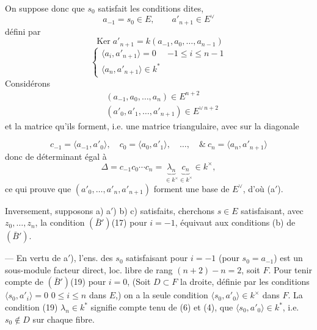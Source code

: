 \documentclass[11pt,a4paper]{article}
\begin{document}
On suppose donc que $s_0$ satisfait les conditions dites, 
\[
a_{-1} = s_0 \in E, \qquad a'_{n+1} \in E^{\vee}
\]
défini par
\[
\operatorname{Ker} a'_{n+1} = k(a_{-1}, a_0, \dots, a_{n-1})
\]
\[
\begin{cases} \langle a_i, a'_{n+1}\rangle = 0 & -1 \leq i \leq n-1 \\ \langle a_n, a'_{n+1}\rangle \in k^* \end{cases}
\]
Considérons
\[
\begin{aligned} &(a_{-1}, a_0, \dots, a_n) \in E^{n+2} \\ &(a'_0, a'_1, \dots, a'_{n+1}) \in E^{\vee\, n+2} \end{aligned}
\]
et la matrice qu'ils forment, i.e. une matrice triangulaire, avec sur la diagonale

\[
c_{-1} = \langle a_{-1}, a'_0\rangle, \quad c_0 = \langle a_0, a'_1\rangle, \quad \dots, \quad \& \ c_n = \langle a_n, a'_{n+1}\rangle
\]
donc de déterminant égal à
\[
\Delta = c_{-1} c_0 \cdots c_n = \underbrace{\lambda_n}_{\in k^\times} \underbrace{c_n}_{\in k^\times} \in k^\times ,
\]
ce qui prouve que  $(a'_0, \dots, a'_n, a'_{n+1})$ forment une base de $E^{\vee}$, d'où (a$'$).

Inversement, supposons a) a$'$) b) c) satisfaits, cherchons $s \in E$ satisfaisant, avec $z_0, \dots, z_n$, la condition $(\bar B')$(17) pour $i = -1$,  équivaut aux conditions (b) de $(\bar B')$.  

— En vertu de a$'$), l'ens. des $s_0$ satisfaisant  pour $i = -1$ (pour $s_0 = a_{-1}$)  est un sous-module facteur direct, loc. libre de rang $(n+2) - n = 2$,  soit $F$. Pour tenir compte de $(\bar B')$(19) pour $i = 0$, (Soit $D \subset F$ la droite, définie par les conditions $\langle s_0, a'_i\rangle = 0$ \quad $0 \leq i \leq n$ dans $E$,)  on a la seule condition $\langle s_0, a'_0\rangle \in k^\times$ dans $F$. La condition (19) $\lambda_n \in k^*$ signifie compte tenu de (6) et (4), que $\langle s_0, a'_0\rangle \in k^*$,  i.e. $s_0 \notin D$ sur chaque fibre.
\end{document}
